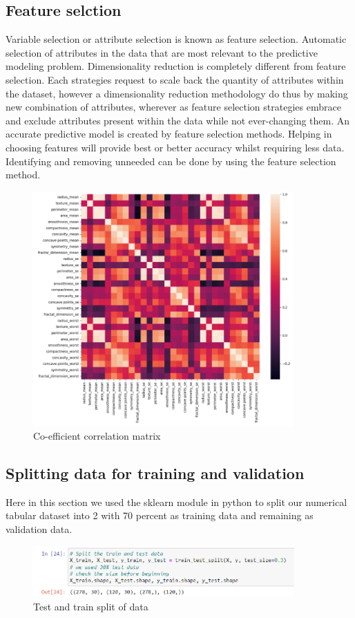 \documentclass[conference]{IEEEtran}
\begin{document}
\subsection{Feature selction}
Variable selection or attribute selection is known as feature selection. Automatic selection of attributes in the data that are most relevant to the predictive modeling problem. Dimensionality reduction is completely different from feature selection. Each strategies request to scale back the quantity of attributes within the dataset, however a dimensionality reduction methodology do thus by making new combination of attributes, wherever as feature selection strategies embrace and exclude attributes present within the data while not ever-changing them. An accurate predictive model is created by feature selection methods. Helping in choosing features will provide best or better accuracy whilst requiring less data. Identifying and removing unneeded can be done by using the feature selection method.
\begin{figure}[htbp]
\centerline{\includegraphics[width=100mm]{correlation.png}}
\caption{Co-efficient correlation matrix}
\label{fig}
\end{figure} 

\subsection{Splitting data for training and validation}
Here in this section we used the sklearn module in python to split our numerical tabular dataset into 2 with 70 percent as training data and remaining as validation data.
\begin{figure}[htbp]
\centerline{\includegraphics[width=100mm]{split_data.png}}
\caption{Test and train split of data}
\label{fig}
\end{figure}
\end{document}
